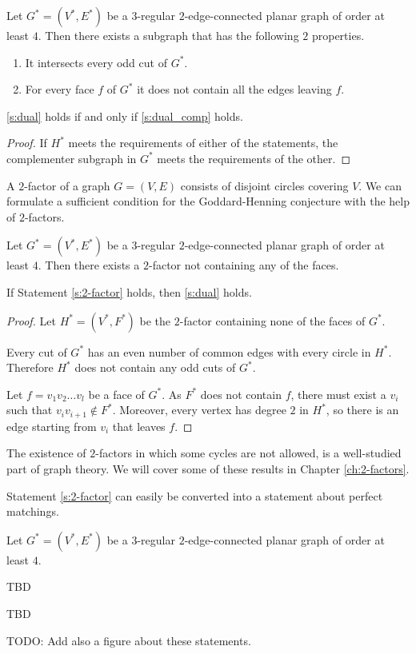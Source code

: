 \begin{guess}\label{s:dual_comp}
  Let $G^* = (V^*, E^*)$ be a $3$-regular $2$-edge-connected planar graph of order at least $4$.
  Then there exists a subgraph that has the following $2$ properties.
  \begin{enumerate}
    \item It intersects every odd cut of $G^*$.
    \item For every face $f$ of $G^*$ it does not contain all the edges leaving $f$.
  \end{enumerate}
\end{guess}

\begin{claim}
  \ref{s:dual} holds if and only if \ref{s:dual_comp} holds.
\end{claim}
\begin{proof}
  If $H^*$ meets the requirements of either of the statements, the complementer subgraph in $G^*$
  meets the requirements of the other.
\end{proof}

A $2$-factor of a graph $G = (V, E)$ consists of disjoint circles covering $V$.
We can formulate a sufficient condition for the Goddard-Henning conjecture with
the help of $2$-factors.

\begin{guess} \label{s:2-factor}
  Let $G^* = (V^*, E^*)$ be a $3$-regular $2$-edge-connected planar graph of order at least $4$.
  Then there exists a $2$-factor not containing any of the faces.
\end{guess}
\begin{claim}
  If Statement \ref{s:2-factor} holds, then \ref{s:dual} holds.
\end{claim}
\begin{proof}
  Let $H^* = (V^*, F^*)$ be the $2$-factor containing none of the faces of $G^*$.

  Every cut of $G^*$ has an even number of common edges with every circle in $H^*$.
  Therefore $H^*$ does not contain any odd cuts of $G^*$.

  Let $f = v_1v_2 \dots v_l$ be a face of $G^*$. As $F^*$ does not contain $f$,
  there must exist a $v_i$ such that $v_iv_{i + 1} \notin F^*$. Moreover, every
  vertex has degree $2$ in $H^*$, so there is an edge starting from $v_i$ that leaves $f$.
\end{proof}

The existence of $2$-factors in which some cycles are not allowed, is a well-studied
part of graph theory. We will cover some of these results in Chapter \ref{ch:2-factors}.

Statement \ref{s:2-factor} can easily be converted into a statement about perfect matchings.

\begin{guess}
  Let $G^* = (V^*, E^*)$ be a $3$-regular $2$-edge-connected planar graph of order at least $4$.

  TBD
\end{guess}
TBD


TODO: Add also a figure about these statements.
